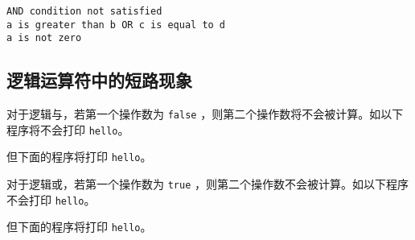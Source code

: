\begin{frame}[fragile]\ft{\subsecname}

\begin{lstlisting}[backgroundcolor=\color{red!10}]
AND condition not satisfied
a is greater than b OR c is equal to d
a is not zero  
\end{lstlisting}
\end{frame}

\subsection{逻辑运算符中的短路现象}

\begin{frame}\ft{\subsecname} 
对于逻辑与，若第一个操作数为   \lstinline|false| ，则第二个操作数将不会被计算。如以下程序将不会打印 \lstinline|hello|。


\end{frame}

\begin{frame}[fragile]\ft{\subsecname} 
但下面的程序将打印 \lstinline|hello|。

\end{frame}

\begin{frame}[fragile]\ft{\subsecname} 
对于逻辑或，若第一个操作数为  \lstinline|true| ，则第二个操作数不会被计算。如以下程序不会打印 \lstinline|hello|。


\end{frame}

\begin{frame}[fragile]\ft{\subsecname} 

但下面的程序将打印 \lstinline|hello|。


\end{frame}
